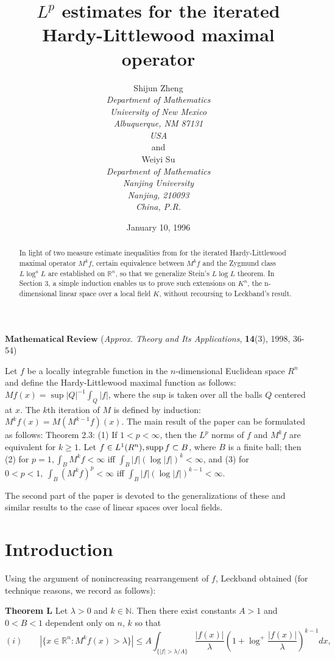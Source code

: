 \documentclass[12pt]{article}
\title{$ L^p$ estimates for the iterated Hardy-Littlewood maximal operator}
\author{Shijun Zheng \\
        {\normalsize {\sl Department of Mathematics }} \\
        {\normalsize {\sl University of New Mexico }}\\
        {\normalsize {\sl Albuquerque, NM 87131}}\\
        {\normalsize {\sl USA}}\\
and\\      
{Weiyi Su}\\
    {\normalsize {\sl Department of Mathematics }} \\
        {\normalsize {\sl Nanjing University}}\\
        {\normalsize {\sl Nanjing, 210093 }}\\
        {\normalsize {\sl China, P.R.}}\\   
        }
\date{January 10, 1996}
\def\lam{\lambda}
\begin{document}
\maketitle

$\mathbf{Mathematical\; Review}$ ({\em Approx. Theory and Its Applications}, {\bf 14}(3),
1998, 36-54)

Let $f$ be a locally integrable function in the $n$-dimensional Euclidean space $ R^n$ and define the Hardy-Littlewood maximal function as follows:
$Mf(x)=\sup|Q|^{-1}\int_Q|f|$, where the sup is taken over all the balls $Q$ centered at $x$. The $k$th iteration of $M$ is defined by induction:
$M^kf(x)=M(M^{k-1}f)(x)$. The main result of the paper can be formulated as follows: Theorem 2.3: (1) If $1<p<\infty$, then the $L^p$ norms of $f$ and $M^kf$
are equivalent for $k\geq1$. Let $f\in L^1( R^n), {\rm supp}\,f\subset B$, where $B$ is a finite ball; then (2) for $p=1, \int_BM^kf<\infty$ iff
$\int_B|f|(\log|f|)^k<\infty$, and (3) for $0<p<1,\ \int_B(M^kf)^p<\infty$ iff $\int_B|f|(\log|f|)^{k-1}<\infty$. 

The second part of the paper is devoted to the generalizations of these and similar results to the case of linear spaces over local fields.


\begin{abstract}

In light of two measure estimate inequalities from \cite{L} for the
iterated Hardy-Littlewood maximal operator $M^k f$, certain
equivalence between $ M^k f$ and the Zygmund class $ L\log^a L  $ are
established on $\mathbb{R}^n$, so that we generalize Stein's $ L\log L
$ theorem. In Section 3, a simple induction enables us to prove such
extensions on $K^n$, the n-dimensional linear space over a local field $K$,  
without recoursing to Leckband's result.

\end{abstract}


\section{Introduction}

Using the argument of nonincreasing rearrangement of $f$, Leckband
obtained (for technique reasons, we record as follows):

{\bf Theorem L} Let $\lam >0$ and $k\in \mathbb{N} $. Then there exist
constants $A>1$ and $0<B<1$ dependent only on $n$, $k$ so that
$$ 
(i) \qquad |\{ x\in \mathbb{R}^n: M^k f(x)>\lam  \} | \le
A\int_{\{|f|>\lam /A   \} } \frac{|f(x)|}{\lam } (1+ \log^+\frac{|f(x)|}{\lam }  )^{k-1}dx, 
$$
\end{document}
